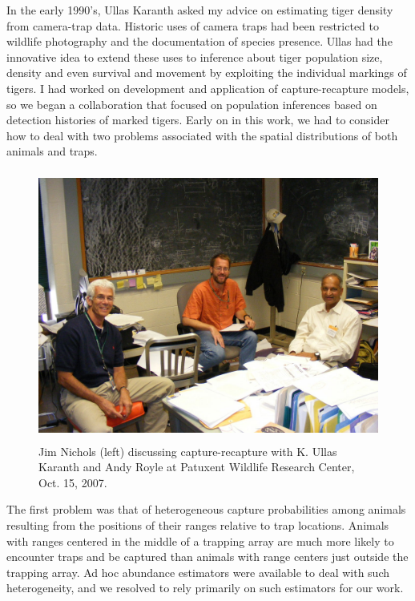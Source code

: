 In the early 1990's, Ullas Karanth 
asked my advice on estimating tiger
density from camera-trap data. Historic uses of camera traps had been
restricted to wildlife photography and the documentation of species
presence. Ullas had the innovative idea to extend these uses to
inference about tiger population size, density and even survival and
movement by exploiting the individual markings of tigers.  I had
worked on development and application of capture-recapture models, so
we began a collaboration that focused on population inferences based
on detection histories of marked tigers. Early on in this work, we had
to consider how to deal with two problems associated with the spatial
distributions of both animals and traps.


\begin{figure}[h!]
\centering
\includegraphics[height=3.5in]{Ch0-Foreword/Nichols_etal.jpg}
\caption{
Jim Nichols (left) discussing capture-recapture with K. Ullas Karanth
and Andy Royle at Patuxent Wildlife Research Center, 
Oct. 15, 2007. 
}
\label{fig.karanth}
\end{figure}

The first problem was that of heterogeneous capture probabilities
among animals resulting from the positions of their ranges relative to
trap locations. Animals with ranges centered in the middle of a
trapping array are much more likely to encounter traps and be captured
than animals with range centers just outside the trapping array. Ad
hoc abundance estimators were available to deal with such
heterogeneity, and we resolved to rely primarily on such estimators
for our work.  


